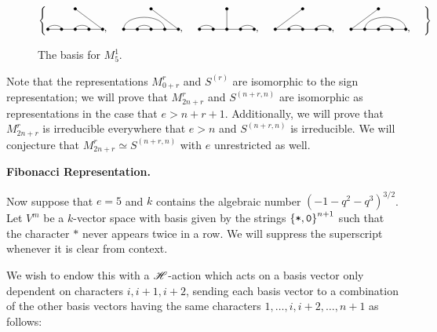 \documentclass{amsart}
\newcommand{\fakesubsection}[1]{
    \vspace{7pt}
    \noindent \textbf{#1.}
  }
\begin{document}
  \begin{figure} 
    \def\cbasisspacing{5mm}
    \begin{adjustbox}{width=\textwidth}
    $\cbr{
      \begin{gathered}
        \GeneralizedMatching{5}{1/2, 3/4}{1}{5/1}{3/4}, \hspace{\cbasisspacing}
        \GeneralizedMatching{5}{1/4, 2/3}{1}{5/1}{3/4}, \hspace{\cbasisspacing}
        \GeneralizedMatching{5}{1/2, 4/5}{1}{3/1}{3/4}, \hspace{\cbasisspacing}
        \GeneralizedMatching{5}{2/3, 4/5}{1}{1/1}{3/4}, \hspace{\cbasisspacing}
        \GeneralizedMatching{5}{2/5, 3/4}{1}{1/1}{3/4}, \hspace{\cbasisspacing}
       \end{gathered}}$ 
     \end{adjustbox}
       \caption{The basis for $M_5^1$.}
    \label{S5 Basis}
   \end{figure} 

  Note that the representations $M_{0 + r}^r$ and $S^{(r)}$ are isomorphic to the sign representation; 
  we will prove that $M_{2n+r}^r$ and $S^{(n+r,n)}$ are isomorphic as representations in the case that $e > n + r + 1$.
  Additionally, we will prove that $M_{2n + r}^r$ is irreducible everywhere that $e > n$ and $S^{(n+r,n)}$ is irreducible.
  We will conjecture that $M_{2n + r}^r \simeq S^{(n+r,n)}$ with $e$ unrestricted as well.
    
  \def\vara{\alpha_1}
  \def\varb{\alpha_2}
  \def\varc{\varepsilon_1}
  \def\vard{\delta}
  \def\vare{\varepsilon_2}
  \def\vs{\texttt{*}}
  \def\vp{\texttt{0}}
  \fakesubsection{Fibonacci Representation}
  Now suppose that $e = 5$ and $k$ contains the algebraic number $(-1 - q^2 - q^3)^{3/2}$.
  Let $V^m$ be a $k$-vector space with basis given by the strings $\cbr{\vs,\vp}^{n+1}$ such that the character $\vs$ never appears twice in a row. 
  We will suppress the superscript whenever it is clear from context.

  We wish to endow this with a $\mathscr{H}$-action which acts on a basis vector only dependent on characters $i,i+1,i+2$, sending each basis vector to a combination of the other basis vectors having the same characters $1,\dots,i,i+2,\dots,n+1$ as follows:
\end{document}
